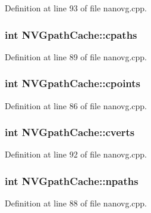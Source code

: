 Definition at line 93 of file nanovg.\+cpp.

\hypertarget{struct_n_v_gpath_cache_abb81be8794e77f4f587d2e4052410c76}{
\subsubsection[{cpaths}]{\setlength{\rightskip}{0pt plus 5cm}int N\+V\+Gpath\+Cache\+::cpaths}}\label{struct_n_v_gpath_cache_abb81be8794e77f4f587d2e4052410c76}


Definition at line 89 of file nanovg.\+cpp.

\hypertarget{struct_n_v_gpath_cache_aaa71429e6c6365908200a6736c31238d}{
\subsubsection[{cpoints}]{\setlength{\rightskip}{0pt plus 5cm}int N\+V\+Gpath\+Cache\+::cpoints}}\label{struct_n_v_gpath_cache_aaa71429e6c6365908200a6736c31238d}


Definition at line 86 of file nanovg.\+cpp.

\hypertarget{struct_n_v_gpath_cache_a645e22306364968e61dcb2b5b4c501de}{
\subsubsection[{cverts}]{\setlength{\rightskip}{0pt plus 5cm}int N\+V\+Gpath\+Cache\+::cverts}}\label{struct_n_v_gpath_cache_a645e22306364968e61dcb2b5b4c501de}


Definition at line 92 of file nanovg.\+cpp.

\hypertarget{struct_n_v_gpath_cache_ae9d1bebaf2bd3192ac194925dbf63c37}{
\subsubsection[{npaths}]{\setlength{\rightskip}{0pt plus 5cm}int N\+V\+Gpath\+Cache\+::npaths}}\label{struct_n_v_gpath_cache_ae9d1bebaf2bd3192ac194925dbf63c37}


Definition at line 88 of file nanovg.\+cpp.

